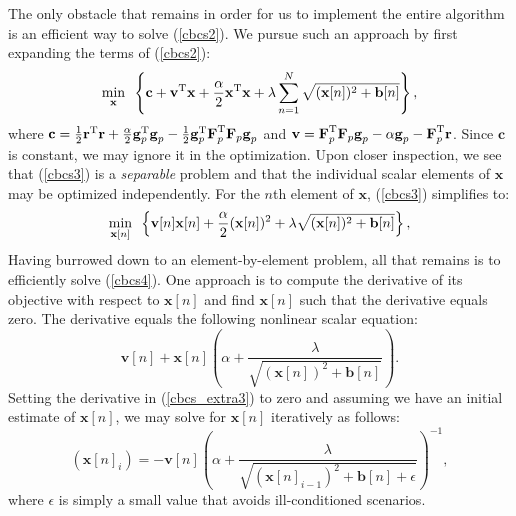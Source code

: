 \documentclass[final]{siamltex}
\newcommand{\la}[1]{\mbox{$\mathbf{#1}$}}  \newcommand{\sst}[1]{\mbox{\scriptsize{#1}}}
\begin{document}
    The only obstacle that remains in order for us to implement the
    entire algorithm is an efficient way to solve (\ref{cbcs2}).  We
    pursue such an approach by first expanding the terms of
    (\ref{cbcs2}):
    \begin{equation}\label{cbcs3}
      \mathop{\mbox{min}}_{\mbox{\scriptsize{$\la{x}$}}}
      \mbox{  }
        \left \{
        \la{c} + \la{v}^{\sst{T}} \la{x} 
               + \frac{\alpha}{2} \la{x}^{\sst{T}} \la{x}
               + \lambda \sum_{n=1}^{N} \sqrt{ (\la{x}[n])^2 + \la{b}[n] }
        \right \},
    \end{equation}
    where $\la{c} = \tfrac{1}{2} \la{r}^{\sst{T}}\la{r} +
    \tfrac{\alpha}{2}\la{g}_p^{\sst{T}}\la{g}_p
    -\tfrac{1}{2}\la{g}_p^{\sst{T}}\la{F}_p^{\sst{T}}\la{F}_p\la{g}_p$
    and $\la{v} = \la{F}_p^{\sst{T}}\la{F}_p\la{g}_p - \alpha\la{g}_p
    - \la{F}_p^{\sst{T}}\la{r}$.  Since $\la{c}$ is constant, we may
    ignore it in the optimization.  Upon closer inspection, we see
    that (\ref{cbcs3}) is a {\em{separable}} problem and that the
    individual scalar elements of $\la{x}$ may be optimized
    independently.  For the $n$th element of \la{x}, (\ref{cbcs3})
    simplifies to:
    \begin{equation}\label{cbcs4}
      \mathop{\mbox{min}}_{\mbox{\scriptsize{$\la{x}[n]$}}}
      \mbox{  }
        \left \{
                 \la{v}[n] \la{x}[n] + 
                 \frac{\alpha}{2} (\la{x}[n])^2 +
                 \lambda \sqrt{ (\la{x}[n])^2 + \la{b}[n] }
        \right \},
    \end{equation}
    Having burrowed down to an element-by-element problem, all that
    remains is to efficiently solve (\ref{cbcs4}).  One approach is to
    compute the derivative of its objective with respect to
    $\la{x}[n]$ and find $\la{x}[n]$ such that the derivative equals
    zero.  The derivative equals the following nonlinear scalar equation:
    \begin{equation}\label{cbcs_extra3}
         \la{v}[n] + \la{x}[n] \left ( \alpha  + 
                                        \frac{\lambda}{\sqrt{(\la{x}[n])^2 + \la{b}[n]}} 
                               \right ).
    \end{equation}
    Setting the derivative in (\ref{cbcs_extra3}) to zero and assuming we have
    an initial estimate of $\la{x}[n]$, we may solve for $\la{x}[n]$
    iteratively as follows:
    \begin{equation}\label{cbcs5}
         (\la{x}[n]_i) =  -\la{v}[n] \left(\alpha + 
           \frac{\lambda}{\sqrt{(\la{x}[n]_{i-1})^2 + \la{b}[n] + \epsilon}}\right)^{-1},
    \end{equation}
    where $\epsilon$ is simply a small value that avoids
    ill-conditioned scenarios.
    
\end{document}
